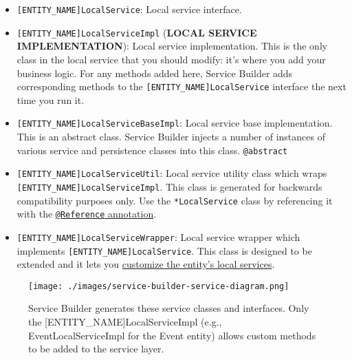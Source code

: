 \begin{itemize}
  \begin{itemize}
  \tightlist
  \item
    \texttt{{[}ENTITY\_NAME{]}LocalService}: Local service interface.
  \item
    \texttt{{[}ENTITY\_NAME{]}LocalServiceImpl} (\textbf{LOCAL SERVICE
    IMPLEMENTATION}): Local service implementation. This is the only
    class in the local service that you should modify: it's where you
    add your business logic. For any methods added here, Service Builder
    adds corresponding methods to the
    \texttt{{[}ENTITY\_NAME{]}LocalService} interface the next time you
    run it.
  \item
    \texttt{{[}ENTITY\_NAME{]}LocalServiceBaseImpl}: Local service base
    implementation. This is an abstract class. Service Builder injects a
    number of instances of various service and persistence classes into
    this class. \texttt{@abstract}
  \item
    \texttt{{[}ENTITY\_NAME{]}LocalServiceUtil}: Local service utility
    class which wraps \texttt{{[}ENTITY\_NAME{]}LocalServiceImpl}. This
    class is generated for backwards compatibility purposes only. Use
    the \texttt{*LocalService} class by referencing it with the
    \href{/docs/7-2/frameworks/-/knowledge_base/f/declarative-services}{\texttt{@Reference}
    annotation}.
  \item
    \texttt{{[}ENTITY\_NAME{]}LocalServiceWrapper}: Local service
    wrapper which implements \texttt{{[}ENTITY\_NAME{]}LocalService}.
    This class is designed to be extended and it lets you
    \href{/docs/7-2/customization/-/knowledge_base/c/overriding-service-builder-services-service-wrappers}{customize
    the entity's local services}.
  \end{itemize}
\end{itemize}

\begin{figure}
\centering
\texttt{[image: ./images/service-builder-service-diagram.png]}
\caption{Service Builder generates these service classes and interfaces.
Only the {[}ENTITY\_NAME{]}LocalServiceImpl (e.g., EventLocalServiceImpl
for the Event entity) allows custom methods to be added to the service
layer.}
\end{figure}

